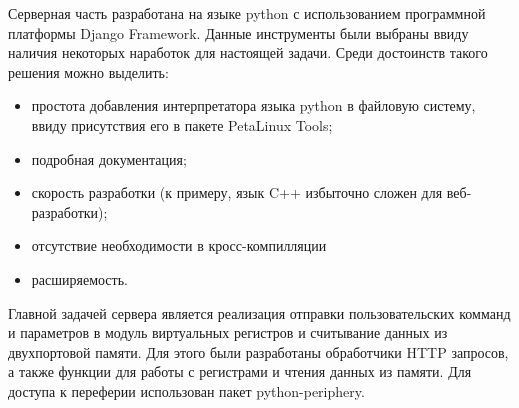 Серверная часть разработана на языке python с использованием программной платформы Django Framework. Данные инструменты были выбраны ввиду наличия некоторых наработок для настоящей задачи. Среди достоинств такого решения можно выделить:\par
\begin{itemize}
    \item простота добавления интерпретатора языка python в файловую систему, ввиду присутствия его в пакете PetaLinux Tools;
    \item подробная документация;
    \item скорость разработки (к примеру, язык C++ избыточно сложен для веб-разработки);
    \item отсутствие необходимости в кросс-компилляции
    \item расширяемость.
\end{itemize}\par
Главной задачей сервера является реализация отправки пользовательских комманд и параметров в модуль виртуальных регистров и считывание данных из двухпортовой памяти. Для этого были разработаны обработчики HTTP запросов, а также функции для работы с регистрами и чтения данных из памяти. Для доступа к переферии использован пакет python-periphery.\par
